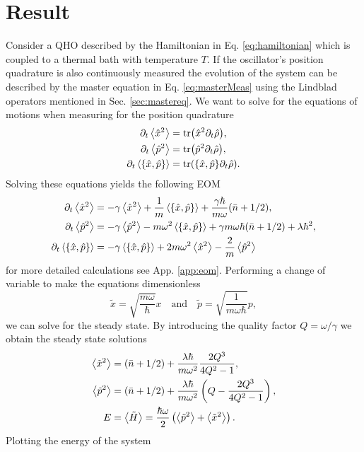 \section{Result}
Consider a QHO described by the Hamiltonian in Eq. \eqref{eq:hamiltonian} which is coupled to a thermal bath with temperature $T$. If the oscillator's position quadrature is also continuously measured the evolution of the system can be described by the master equation in Eq. \eqref{eq:masterMeas} using the Lindblad operators mentioned in Sec. \ref{sec:mastereq}. We want to solve for the equations of motions when measuring for the position quadrature
\begin{align}
    \dt\expval{\xop^2} &= \tr(\xop^2 \dt \dmatrix)\label{eq:x2}, \\
    \dt\expval{\pop^2} &= \tr(\pop^2 \dt \dmatrix)\label{eq:p2},\\
    \dt\expval{\acomm{\xop}{\pop}} &= \tr(\acomm{\xop}{\pop} \dt \dmatrix). \label{eq:xp}
\end{align}
Solving these equations yields the following EOM
\begin{align}
    \dt\expval{\xop^2} &= - \gamma \expval{\xop^2} + \frac{1}{m}\expval{\acomm{\xop}{\pop}} + \frac{\gamma \hbar}{m\omega}(\nbar + 1/2),\\
    \dt\expval{\pop^2} &= -\gamma \expval{\pop^2} - m\omega^2 \expval{\acomm{\xop}{\pop}} + \gamma m \omega\hbar (\nbar + 1/2) + \lambda \hbar^2,\\
    \dt\expval{\acomm{\xop}{\pop}} &= -\gamma \expval{\acomm{\xop}{\pop}} + 2 m \omega^2 \expval{\xop^2} - \frac{2}{m} \expval{\pop^2}
\end{align}
for more detailed calculations see App. \ref{app:eom}. Performing a change of variable to make the equations dimensionless
\begin{equation}
    \tilde{x} = \sqrt{\frac{m\omega}{\hbar}} x \quad \text{and} \quad \tilde{p} = \sqrt{\frac{1}{m \omega \hbar}} p ,
\end{equation}
we can solve for the steady state. By introducing the quality factor $Q = \omega / \gamma$ we obtain the steady state solutions
\begin{align}
    \expval{\tilde{x}^2} &= (\bar{n} + 1/2) + \frac{\lambda \hbar}{m \omega^2} \frac{2 Q^3}{4Q^2 - 1},\\
    \expval{\tilde{p}^2} &= (\bar{n} + 1/2) + \frac{\lambda \hbar}{m \omega^2} \left( Q - \frac{2Q^3}{4Q^2 - 1} \right),\\
    E &= \expval{\tilde{H}} = \frac{\hbar \omega}{2} \left( \expval{\tilde{p}^2} + \expval{\tilde{x}^2} \right).
\end{align}
Plotting the energy of the system 

